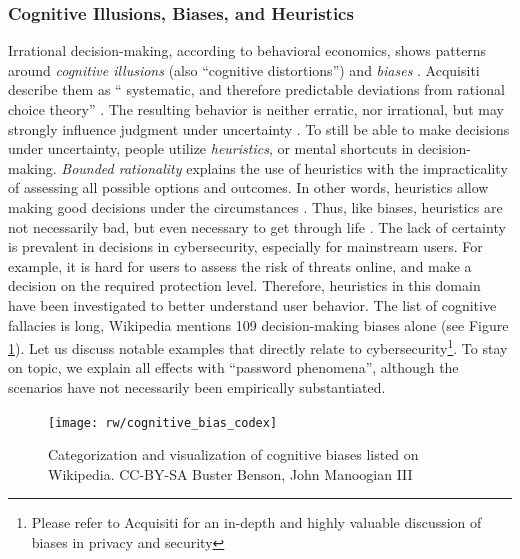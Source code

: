 	\subsubsection{Cognitive Illusions, Biases, and Heuristics}
	Irrational decision-making, according to behavioral economics, shows patterns around \textit{cognitive illusions} (also ``cognitive distortions'') and \textit{biases} \cite{Lockton2012CognitiveBiases}. Acquisiti \etal describe them as ``
	systematic, and therefore predictable deviations from rational choice theory'' \cite{Acquisti2017NudgesPrivacySecurity}. The resulting behavior is neither erratic, nor irrational, but may strongly influence judgment under uncertainty \cite{Tversky1974HeuristicsBiases}. To still be able to make decisions under uncertainty, people utilize \textit{heuristics}, or mental shortcuts in decision-making. \textit{Bounded rationality} explains the use of heuristics with the impracticality of assessing all possible options and outcomes. In other words, heuristics allow making good decisions under the circumstances \cite{Kahneman2003MapsOfBoundedRationality}. Thus, like biases, heuristics are not necessarily bad, but even necessary to get through life \cite{Cialdini2007Influence}.
	The lack of certainty is prevalent in decisions in cybersecurity, especially for mainstream users. For example, it is hard for users to assess the risk of threats online, and make a decision on the required protection level. Therefore, heuristics in this domain have been investigated to better understand user behavior. 
	The list of cognitive fallacies is long, Wikipedia mentions 109 decision-making biases alone  (see Figure \ref{fig:rw:cognitive-biases}). Let us discuss notable examples that directly relate to cybersecurity\footnote{Please refer to Acquisiti \etal \cite{Acquisti2017NudgesPrivacySecurity} for an in-depth and highly valuable discussion of biases in privacy and security}. To stay on topic, we explain all effects with ``password phenomena'', although the scenarios have not necessarily been empirically substantiated.
	
	\begin{figure}
		\centering
		\texttt{[image: rw/cognitive\_bias\_codex]}
		\caption{\label{fig:rw:cognitive-biases}Categorization and visualization of cognitive biases listed on Wikipedia. CC-BY-SA Buster Benson, John Manoogian III}
	\end{figure}

